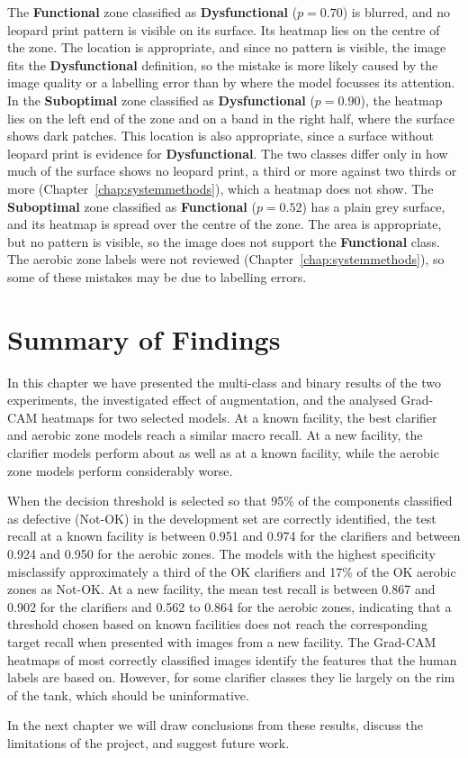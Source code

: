 The \textbf{Functional} zone classified as \textbf{Dysfunctional} ($p = 0.70$) is blurred, and no leopard print pattern is visible on its surface. Its heatmap lies on the centre of the zone. The location is appropriate, and since no pattern is visible, the image fits the \textbf{Dysfunctional} definition, so the mistake is more likely caused by the image quality or a labelling error than by where the model focusses its attention. In the \textbf{Suboptimal} zone classified as \textbf{Dysfunctional} ($p = 0.90$), the heatmap lies on the left end of the zone and on a band in the right half, where the surface shows dark patches. This location is also appropriate, since a surface without leopard print is evidence for \textbf{Dysfunctional}. The two classes differ only in how much of the surface shows no leopard print, a third or more against two thirds or more (Chapter~\ref{chap:systemmethods}), which a heatmap does not show. The \textbf{Suboptimal} zone classified as \textbf{Functional} ($p = 0.52$) has a plain grey surface, and its heatmap is spread over the centre of the zone. The area is appropriate, but no pattern is visible, so the image does not support the \textbf{Functional} class. The aerobic zone labels were not reviewed (Chapter~\ref{chap:systemmethods}), so some of these mistakes may be due to labelling errors.


\section{Summary of Findings}
\label{sec:results_summary}

In this chapter we have presented the multi-class and binary results of the two experiments, the investigated effect of augmentation, and the analysed Grad-CAM heatmaps for two selected models. At a known facility, the best clarifier and aerobic zone models reach a similar macro recall. At a new facility, the clarifier models perform about as well as at a known facility, while the aerobic zone models perform considerably worse. 

When the decision threshold is selected so that 95\% of the components classified as defective (Not-OK) in the development set are correctly identified, the test recall at a known facility is between 0.951 and 0.974 for the clarifiers and between 0.924 and 0.950 for the aerobic zones. The models with the highest specificity misclassify approximately a third of the OK clarifiers and 17\% of the OK aerobic zones as Not-OK. At a new facility, the mean test recall is between 0.867 and 0.902 for the clarifiers and 0.562 to 0.864 for the aerobic zones, indicating that a threshold chosen based on known facilities does not reach the corresponding target recall when presented with images from a new facility. The Grad-CAM heatmaps of most correctly classified images identify the features that the human labels are based on. However, for some clarifier classes they lie largely on the rim of the tank, which should be uninformative.

In the next chapter we will draw conclusions from these results, discuss the limitations of the project, and suggest future work.
